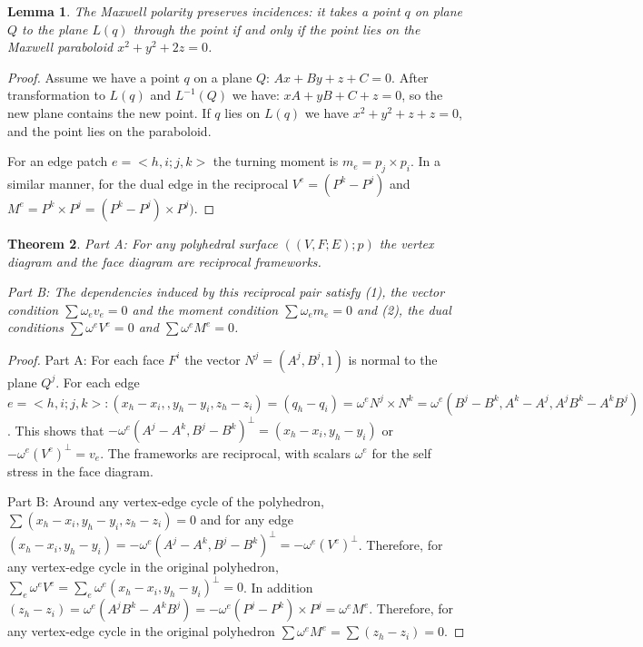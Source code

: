 \documentclass[11pt]{article}
\newtheorem{theorem}{Theorem}[section]
\newtheorem{lemma}[theorem]{Lemma}
\theoremstyle{definition}
\begin{document}
	\begin{lemma}
		The Maxwell polarity preserves incidences: it takes a point $q$ on plane $Q$ to the plane $L(q)$ through the point if and only if the point lies on the Maxwell paraboloid $x^2 + y^2 + 2z = 0$.
 	\end{lemma}
	
	\begin{proof}
		Assume we have a point $q$ on a plane $Q$: $Ax + By + z + C = 0$. 
		After transformation to $L(q)$ and $L^{-1}(Q)$ we have: $xA + yB + C + z = 0$, so the new plane contains the new point. 
		If $q$ lies on $L(q)$ we have $x^2 + y^2 + z + z = 0$, and the point lies on the paraboloid. 
 
 		For an edge patch $e = <h,i;j,k>$ the turning moment is $m_e = p_j \times p_i$. 
		In a similar manner, for the dual edge in the reciprocal $V^e = (P^k - P^j)$ and $M^e = P^k \times P^j = (P^k - P^j)\times P^j)$.
	\end{proof}
 
	\begin{theorem}
		Part A: For any polyhedral surface $((V,F;E);p)$ the vertex diagram and the face diagram are reciprocal frameworks.
		
 		Part B: The dependencies induced by this reciprocal pair satisfy 
		(1), the vector condition $\sum \omega_e v_e = 0$ and the moment condition $\sum \omega_e m_e = 0$ and 
		(2), the dual conditions $\sum \omega^e V^e = 0$ and $\sum \omega^e M^e = 0$.
	\end{theorem}
 
 	\begin{proof}
		Part A: 
		For each face $F^i$ the vector $N^j = (A^j, B^j,1)$ is normal to the plane $Q^j$. 
		For each edge $e = <h,i;j,k>:  (x_h-x_i,,y_h-y_i, z_h-z_i)=(q_h-q_i) = \omega^e N^j \times N^k = \omega^e(B^j-B^k,A^k-A^j,A^jB^k-A^kB^j)$. 
		This shows that $-\omega^e(A^j-A^k,B^j-B^k)^\bot = (x_h - x_i, y_h-y_i)$ or $-\omega^e(V^e)^\bot = v_e$. 
		The frameworks are reciprocal, with scalars $\omega^e$ for the self stress in the face diagram.
 
 		Part B: 
		Around any vertex-edge cycle of the polyhedron, $\sum(x_h - x_i, y_h-y_i, z_h-z_i) = 0$ and for any edge $(x_h-x_i,y_h-y_i) = -\omega^e(A^j-A^k,B^j-B^k)^\bot = -\omega^e(V^e)^\bot$. 
		Therefore, for any vertex-edge cycle in the original polyhedron, $\sum_e \omega^eV^e = \sum_e \omega^e(x_h-x_i,y_h-y_i)^\bot = 0$. 
		In addition $(z_h-z_i) = \omega^e(A^jB^k-A^kB^j) = -\omega^e(P^j-P^k) \times P^j = \omega^eM^e$. 
		Therefore, for any vertex-edge cycle in the original polyhedron $\sum \omega^eM^e = \sum(z_h-z_i) = 0$. 
 	\end{proof}
	
\end{document}
